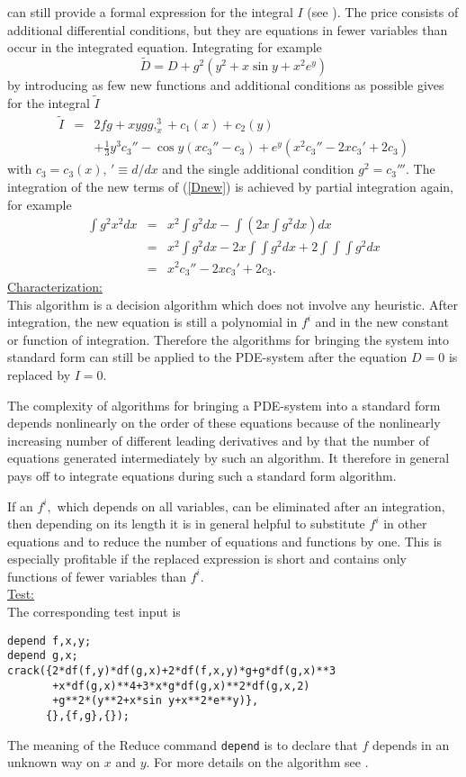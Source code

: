 \documentclass[12pt]{article}
\begin{document}
can still provide a formal expression for the integral $I$
(see \cite{Wol99e}). The price consists of
additional differential conditions, but they are equations in fewer variables
than occur in the integrated equation. Integrating for example 
\begin{equation}
\tilde{D} = D + g^2(y^2 + x\sin y + x^2e^y)       \label{Dnew}
\end{equation}
by introducing as few 
new functions and additional conditions as possible gives for the integral 
$\tilde{I}$
\begin{eqnarray*}
\tilde{I} & = & 2fg + xygg,_{x}^{3} + c_1(x) + c_2(y) \\
  &   & + \frac{1}{3}y^3c_3'' - \cos y(xc_3'' - c_3)
+ e^y(x^2c_3'' - 2xc_3' + 2c_3)          
\end{eqnarray*}
with $c_3 = c_3(x), \, '\equiv d/dx$ and the single additional 
condition $g^2 = c_3'''.$
The integration of the new terms of (\ref{Dnew}) is
achieved by partial integration again, for example
\begin{eqnarray*}
\int g^2x^2 dx & = & x^2\int g^2 dx - \int (2x\!\int g^2 dx) dx \\
& = & x^2\int g^2 dx - 2x\int\!\!\int g^2 dx 
+ 2 \int\!\!\int\!\!\int g^2 dx \\
& = & x^2c_3'' - 2xc_3' + 2c_3.
\end{eqnarray*}
\underline{Characterization:} \\
This algorithm is a decision algorithm which does not involve any
heuristic. 
After integration, the new equation is still a polynomial
in $f^i$ and in the new constant or function of integration.
Therefore the algorithms for bringing the system into standard form can still 
be applied to the PDE-system 
after the equation $D = 0$ is replaced by $I = 0.$

The complexity of algorithms for bringing a PDE-system into a standard
form depends nonlinearly on the order of these equations because of
the nonlinearly increasing number of different leading derivatives
and by that the number of equations generated intermediately by such
an algorithm. It therefore in general pays off to integrate equations 
during such a standard form algorithm.  

If an $f^i,$ which depends on all variables, can be eliminated after an 
integration, then depending on its length 
it is in general helpful to substitute $f^i$ in other equations and
to reduce the number of equations and functions by one. This is especially
profitable if the replaced expression is short and 
contains only functions of fewer variables than $f^i.$ \\
\underline{Test:} \\
The corresponding test input is
\begin{verbatim}
depend f,x,y;
depend g,x;
crack({2*df(f,y)*df(g,x)+2*df(f,x,y)*g+g*df(g,x)**3
       +x*df(g,x)**4+3*x*g*df(g,x)**2*df(g,x,2)
       +g**2*(y**2+x*sin y+x**2*e**y)},
      {},{f,g},{});
\end{verbatim}
The meaning of the {\sc Reduce} command {\tt depend} is to declare that $f$
depends in an unknown way on $x$ and $y$. For more details on the
algorithm see \cite{Wol99e}.
\end{document}
